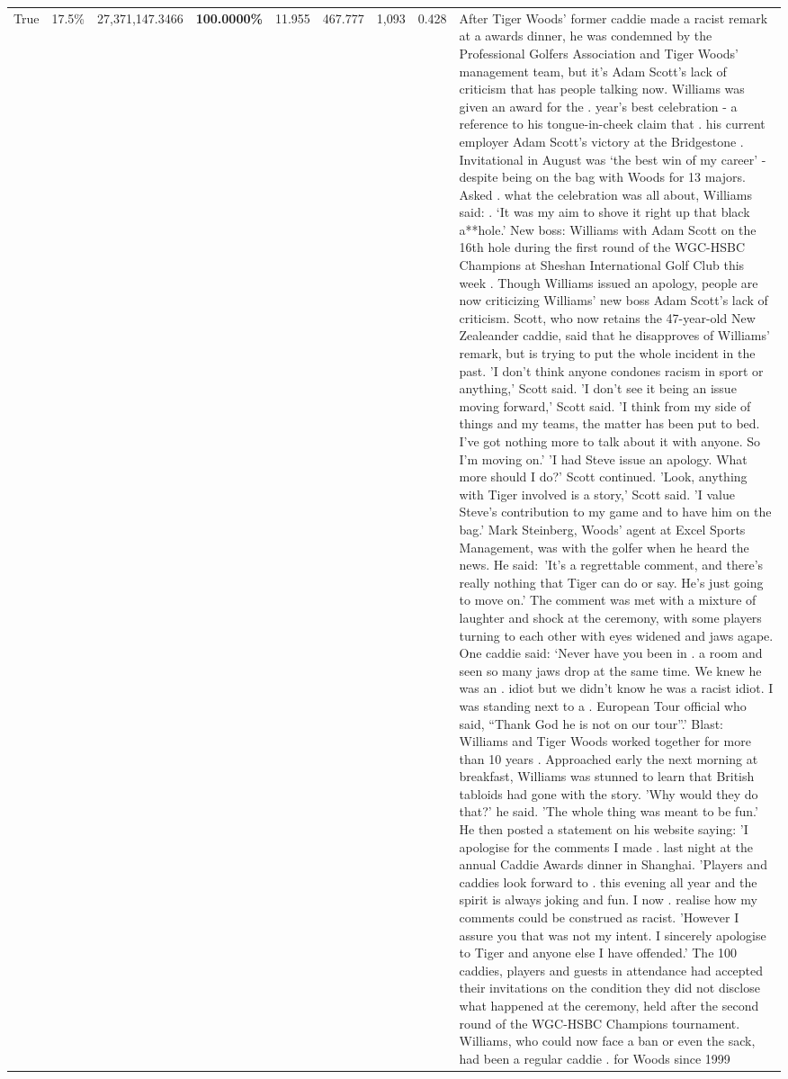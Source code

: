 \begin{table}[H]
\begin{tabular}{lllrlllll}
True & 17.5\% & 27,371,147.3466 & \bfseries \color{red} 100.0000\% & 11.955 & 467.777 & 1,093 & 0.428 & After Tiger Woods' former caddie made a racist remark at a awards dinner, he was condemned by the Professional Golfers Association and Tiger Woods' management team, but it's Adam Scott's lack of criticism that has people talking now. Williams was given an award for the . year’s best celebration - a reference to his tongue-in-cheek claim that . his current employer Adam Scott’s victory at the Bridgestone . Invitational in August was ‘the best win of my career’ - despite being on the bag with Woods for 13 majors. Asked . what the celebration was all about, Williams said: . ‘It was my aim to shove it right up that black a**hole.’ New boss: Williams with Adam Scott  on the 16th hole during the first round of the WGC-HSBC Champions at Sheshan International Golf Club this week . Though Williams issued an apology, people are now criticizing Williams' new boss Adam Scott's lack of criticism. Scott, who now retains the 47-year-old New Zealeander caddie, said that he disapproves of Williams' remark, but is trying to put the whole incident in the past. 'I don't think anyone condones racism in sport or anything,' Scott said. 'I don't see it being an issue moving forward,' Scott said. 'I think from my side of things and my teams, the matter has been put to bed. I've got nothing more to talk about it with anyone. So I'm moving on.' 'I had Steve issue an apology. What more should I do?' Scott continued. 'Look, anything with Tiger involved is a story,' Scott said. 'I value Steve's contribution to my game and to have him on the bag.' Mark Steinberg, Woods' agent at Excel Sports Management, was with the golfer when he heard the news. He said: 'It's a regrettable comment, and there's really nothing that Tiger can do or say. He's just going to move on.' The comment was met with a mixture of laughter and shock at the ceremony, with some players turning to each other with eyes widened and jaws agape. One caddie said: ‘Never have you been in . a room and seen so many jaws drop at the same time. We knew he was an . idiot but we didn’t know he was a racist idiot. I was standing next to a . European Tour official who said, “Thank God he is not on our tour”.’ Blast: Williams and Tiger Woods worked together for more than 10 years . Approached early the next morning at breakfast, Williams was stunned to learn that British tabloids had gone with the story. 'Why would they do that?' he said. 'The whole thing was meant to be fun.' He then posted a statement on his website saying: 'I apologise for the comments I made . last night at the annual Caddie Awards dinner in Shanghai. 'Players and caddies look forward to . this evening all year and the spirit is always joking and fun. I now . realise how my comments could be construed as racist. 'However I assure you that was not my intent. I sincerely apologise to Tiger and anyone else I have offended.' The 100 caddies, players and guests in attendance had accepted their invitations on the condition they did not disclose what happened at the ceremony, held after the second round of the WGC-HSBC Champions tournament. Williams, who could now face a ban or even the sack, had been a regular caddie . for Woods since 1999 
\end{tabular}
\end{table}
